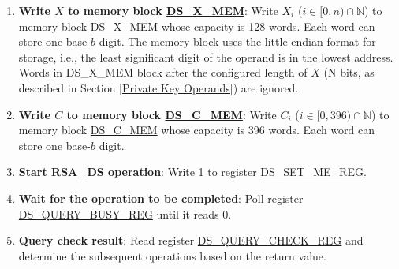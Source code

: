 \documentclass[main\_\_EN.tex]{subfiles}
\begin{document}
\begin{enumerate}
    \item {\bfseries Write \begin{math}X\end{math} to memory block \hyperref[DSXMEM]{DS\_X\_MEM}}: Write
        \begin{math}X_{i}\end{math}
        (\begin{math}i \in [0,n) \cap \mathbb{N}\end{math}) to memory block \hyperref[DSXMEM]{DS\_X\_MEM} whose capacity is 128 words. Each word can store one base-\begin{math}b\end{math} digit. The memory block uses the little endian format for storage, i.e., the least significant digit of the operand is in the lowest address. Words in DS\_X\_MEM block after the configured length of \begin{math}X\end{math} (N bits, as described in Section \ref{Private Key Operands}) are ignored.

    \item {\bfseries Write \begin{math}C\end{math} to memory block \hyperref[DSCMEM]{DS\_C\_MEM}}: Write
        \begin{math}C_{i}\end{math}
        (\begin{math}i \in [0,396) \cap \mathbb{N}\end{math}) to memory block \hyperref[DSCMEM]{DS\_C\_MEM} whose capacity is 396 words. Each word can store one base-\begin{math}b\end{math} digit.

    \item {\bfseries Start RSA\_DS operation}: Write 1 to register \hyperref[regdesc:DSSETMEREG]{DS\_SET\_ME\_REG}.

    \item {\bfseries Wait for the operation to be completed}: Poll register \hyperref[regdesc:DSQUERYBUSYREG]{DS\_QUERY\_BUSY\_REG} until it reads 0.

    \item {\bfseries Query check result}: Read register \hyperref[regdesc:DSQUERYCHECKREG]{DS\_QUERY\_CHECK\_REG} and determine the subsequent operations based on the return value.

    \begin{itemize}


\end{itemize}
\end{enumerate}
\end{document}
